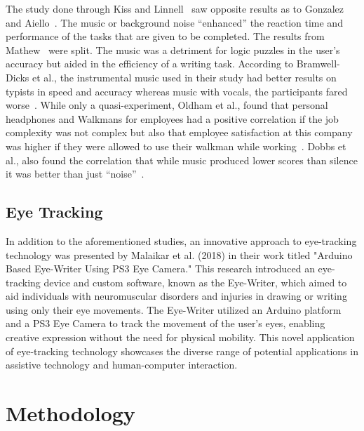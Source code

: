 \documentclass[manuscript, screen, review]{acmart} %
\begin{document}
The study done through Kiss and Linnell~\cite{kiss2021effect} saw opposite results as to Gonzalez and Aiello~\cite{Gonzalez_Aiello_2019}. The music or background noise ``enhanced'' the reaction time and performance of the tasks that are given to be completed. 
The results from Mathew~\cite{mathew2022inherently} were split. 
The music was a detriment for logic puzzles in the user's accuracy but aided in the efficiency of a writing task. 
According to Bramwell-Dicks et al., the instrumental music used in their study had better results on typists in speed and accuracy whereas music with vocals, the participants fared worse~\cite{bramwell2016can}.
While only a quasi-experiment, Oldham et al., found that personal headphones and Walkmans for employees had a positive correlation if the job complexity was not complex but also that employee satisfaction at this company was higher if they were allowed to use their walkman while working~\cite{oldhamListen}. Dobbs et al., also found the correlation that while music produced lower scores than silence it was better than just ``noise''~\cite{effectsOfBackgroundDobbs}.

\subsection{Eye Tracking}
In addition to the aforementioned studies, an innovative approach to eye-tracking technology was presented by \cite{Malaikar2018Arduino}Malaikar et al. (2018) in their work titled "Arduino Based Eye-Writer Using PS3 Eye Camera." This research introduced an eye-tracking device and custom software, known as the Eye-Writer, which aimed to aid individuals with neuromuscular disorders and injuries in drawing or writing using only their eye movements. The Eye-Writer utilized an Arduino platform and a PS3 Eye Camera to track the movement of the user's eyes, enabling creative expression without the need for physical mobility. This novel application of eye-tracking technology showcases the diverse range of potential applications in assistive technology and human-computer interaction.

\section{Methodology}
\end{document}
